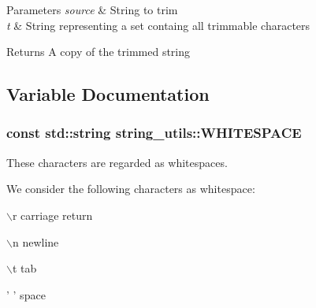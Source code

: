 \begin{DoxyParams}{\-Parameters}
{\em source} & \-String to trim \\
\hline
{\em t} & \-String representing a set containg all trimmable characters \\
\hline
\end{DoxyParams}
\begin{DoxyReturn}{\-Returns}
\-A copy of the trimmed string 
\end{DoxyReturn}


\subsection{\-Variable \-Documentation}
\hypertarget{namespacestring__utils_a716c3d0cc1ab19bd56d1b2aa2a50662f}{
\subsubsection[{\-W\-H\-I\-T\-E\-S\-P\-A\-C\-E}]{\setlength{\rightskip}{0pt plus 5cm}const std\-::string {\bf string\-\_\-utils\-::\-W\-H\-I\-T\-E\-S\-P\-A\-C\-E}}}\label{namespacestring__utils_a716c3d0cc1ab19bd56d1b2aa2a50662f}


\-These characters are regarded as whitespaces. 

\-We consider the following characters as whitespace\-:
\begin{DoxyItemize}
\item {\ttfamily $\backslash$r} carriage return
\item {\ttfamily $\backslash$n} newline
\item {\ttfamily $\backslash$t} tab
\item {\ttfamily ' '} space 
\end{DoxyItemize}